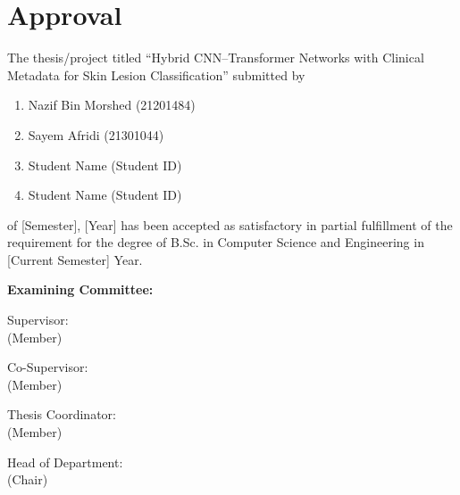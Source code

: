 \section*{Approval}

The thesis/project titled ``Hybrid CNN--Transformer Networks with Clinical
Metadata for Skin Lesion Classification'' submitted by
\begin{enumerate}
  \item Nazif Bin Morshed (21201484)
  \item Sayem Afridi (21301044)
  \item Student Name (Student ID)
  \item Student Name (Student ID)
\end{enumerate}

of [Semester], [Year] has been accepted as satisfactory in partial fulfillment of the requirement for the degree of B.Sc. in Computer Science and Engineering in [Current Semester] Year.

\vspace{0.5cm}
\textbf{Examining Committee:}

\vspace{1cm}

Supervisor:\\
(Member)
\begin{center}
    \hspace{7cm}  \hspace{1cm}
\end{center}

Co-Supervisor:\\
(Member)
\begin{center}
    \hspace{7cm}  \hspace{1cm}
\end{center}

Thesis Coordinator:\\
(Member)
\begin{center}
    \hspace{7cm}  \hspace{1cm}
\end{center}

Head of Department:\\
(Chair)
\begin{center}
    \hspace{7cm}  \hspace{1cm}
\end{center}

\pagebreak
